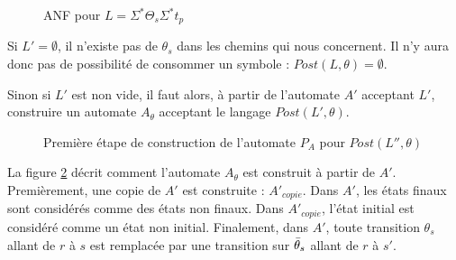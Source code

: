 \begin{figure}[H]
    \centering
    \caption{ANF pour $L=\Sigma^*\Theta_s\Sigma^*t_p$}\label{fig:lseconde}
\end{figure}

Si $L'=\emptyset$, il n'existe pas de $\theta_s$ dans les chemins qui nous concernent. Il n'y aura donc pas de possibilité de consommer un symbole : $Post(L,\theta)=\emptyset$.

Sinon si $L'$ est non vide, il faut alors, à partir de l'automate $A'$ acceptant $L'$, construire un automate $A_\theta$ acceptant le langage $Post(L',\theta)$.

\begin{figure}[H]
    \centering
    \caption{Première étape de construction de l'automate $P_A$ pour $Post(L'',\theta)$}\label{fig:aaprime}
\end{figure}

La figure \ref{fig:aaprime} décrit comment l'automate $A_\theta$ est construit à partir de $A'$. Premièrement, une copie de $A'$ est construite : $A'_{copie}$.
Dans $A'$, les états finaux sont considérés comme des états non finaux. Dans $A'_{copie}$, l'état initial est considéré comme un état non initial. Finalement, dans $A'$, toute transition $\theta_s$ allant de $r$ à $s$ est remplacée par une transition sur $\bar{\theta}_s$ allant de $r$ à $s'$.

